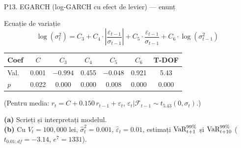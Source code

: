 \documentclass[9pt, aspectratio=169, t]{beamer}
\begin{document}
\begin{frame}{P13. EGARCH (log-GARCH cu efect de levier) --- enunț}
\begin{block}{Ecuație de variație}
\[
\log(\sigma^2_{t}) = C_3 + C_4 \cdot \left|\frac{\varepsilon_{t-1}}{\sigma_{t-1}}\right| + C_5\cdot \frac{\varepsilon_{t-1}}{\sigma_{t-1}} + C_6 \cdot \log(\sigma^2_{t-1})
\]
\begin{center}\small
\begin{tabular}{lcccccc}\toprule
Coef & $C$ & $C_3$ & $C_4$ & $C_5$ & $C_6$ & T-DOF\\\midrule
Val. & 0.001 & $-0.994$ & 0.455 & $-0.048$ & 0.921 & 5.43\\
$p$ & 0.022 & 0.000 & 0.000 & 0.008 & 0.000 & 0.000\\\bottomrule
\end{tabular}
\end{center}
(Pentru media: $r_t = C + 0.150\,r_{t-1} + \varepsilon_t$, $\varepsilon_t|\mathcal F_{t-1}\sim t_{5.43}(0,\sigma_t)$.)

\textbf{(a)} Scrieți și interpretați modelul.\\
\textbf{(b)} Cu $V_t=100{,}000$ lei, $\hat\sigma_t^2=0.001$, $\hat\varepsilon_t=0.01$, estimați $\text{VaR}_{t+1}^{99\%}$ și $\text{VaR}_{t+10}^{99\%}$ ($t_{0.01;df}=-3.14$, $e^7=1331$).
\end{block}
\end{frame}
\end{document}

